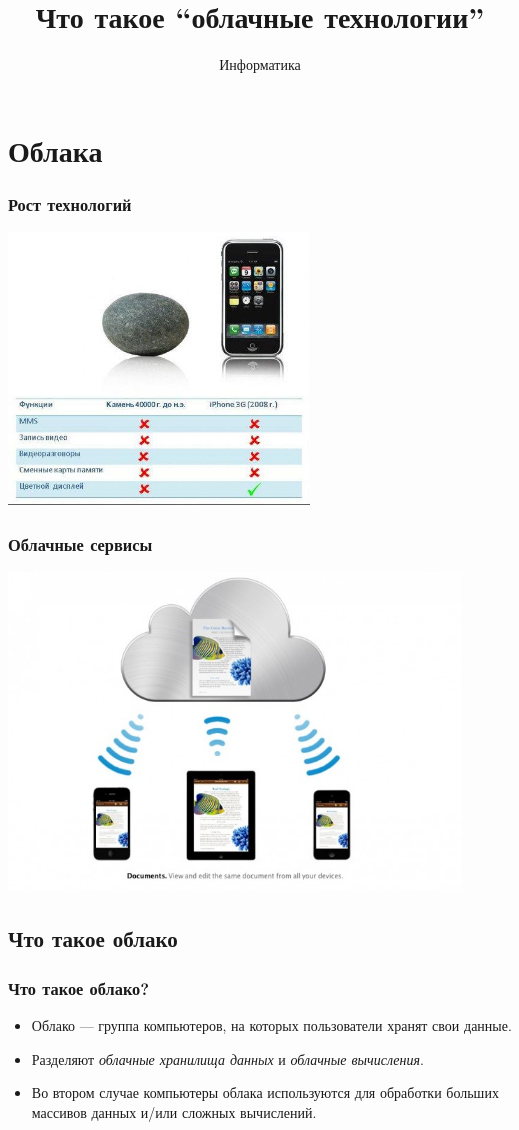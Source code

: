 \documentclass[compress,red]{beamer}
\title{Что такое ``облачные технологии''}
\author{Информатика}
\begin{document}
\maketitle

\section{Облака}

\begin{frame}[fragile]
  \frametitle{Рост технологий}
  \centerline{\includegraphics[width=0.6\textwidth]{images/iphone-vs-stone.png}}
\end{frame}

\begin{frame}[fragile]
  \frametitle{Облачные сервисы}
  \centerline{\includegraphics[width=0.9\textwidth]{images/icloud.jpg}}
\end{frame}

\subsection{Что такое облако}
\begin{frame}[fragile]
  \frametitle{Что такое облако?}
  \begin{itemize}
    \item Облако --- группа компьютеров, на которых пользователи хранят свои данные.
    \item Разделяют \emph{облачные хранилища данных} и \emph{облачные вычисления}.
    \item Во втором случае компьютеры облака используются для обработки больших массивов данных и/или сложных вычислений.
  \end{itemize}
\end{frame}
\end{document}
